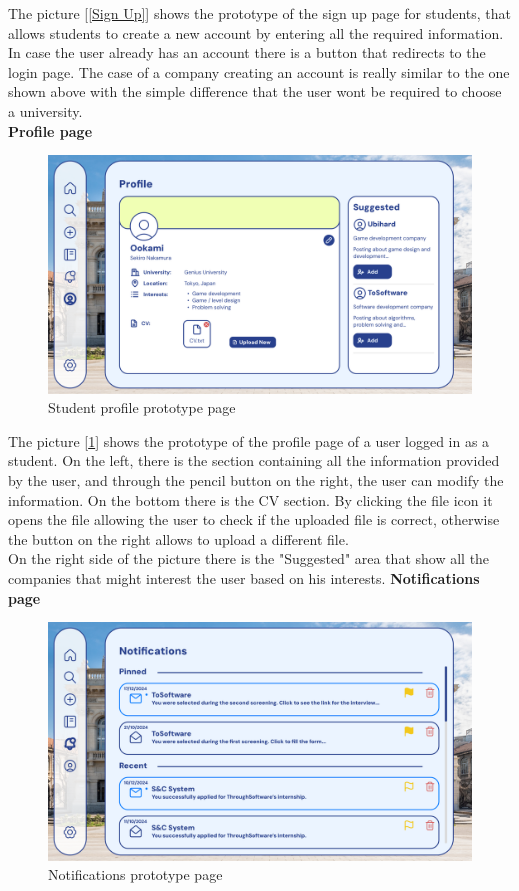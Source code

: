 \documentclass[11pt,twoside]{article}
\begin{document}
The picture [\ref{Sign Up}] shows the prototype of the sign up page for students, that allows students to create a new account by entering all the required information. In case the user already has an account there is a button that redirects to the login page. The case of a company creating an account is really similar to the one shown above with the simple difference that the user wont be required to choose a university.
\vspace{1\baselineskip} \\
\large{\textbf{Profile page}}\\
\begin{figure}[H]
\includegraphics[width=\textwidth]{Images/Profile}
\caption{Student profile prototype page}\label{Student Profile}
\end{figure}
The picture [\ref{Student Profile}] shows the prototype of the profile page of a user logged in as a student. On the left, there is the section containing all the information provided by the user, and through the pencil button on the right, the user can modify the information. On the bottom there is the CV section. By clicking the file icon it opens the file allowing the user to check if the uploaded file is correct, otherwise the button on the right allows to upload a different file.\\
On the right side of the picture there is the "Suggested" area that show all the companies that might interest the user based on his interests.
\newpage
\large{\textbf{Notifications page}}\\
\begin{figure}[H]
\includegraphics[width=\textwidth]{Images/Notifications}
\caption{Notifications prototype page}\label{Notifications}
\end{figure}
\end{document}

